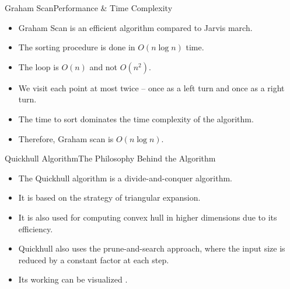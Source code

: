 \documentclass{beamer}
\begin{document}
\begin{frame}{Graham Scan}{Performance \& Time Complexity}
    \begin{itemize}
        \item Graham Scan is an efficient algorithm compared to Jarvis march.
        \vspace{0.25 em}
        \item The sorting procedure is done in $O(n \log n)$ time. 
        \vspace{0.25 em}
        \item The loop is $O(n)$ and not $O(n^2)$.
        \vspace{0.25 em}
        \item We visit each point at most twice -- once as a left turn and once as a right turn. 
        \vspace{0.25 em}
        \item The time to sort dominates the time complexity of the algorithm. 
        \vspace{0.25 em}
        \item Therefore, Graham scan is $O(n \log n)$.
    \end{itemize}
\end{frame}

\begin{frame}{Quickhull Algorithm}{The Philosophy Behind the Algorithm}
    \begin{itemize}
        \item The Quickhull algorithm is a divide-and-conquer algorithm. 
        \vspace{0.5 em}
        \item It is based on the strategy of triangular expansion. 
        \vspace{0.5 em}
        \item It is also used for computing convex hull in higher dimensions due to its efficiency. 
        \vspace{0.5 em}
        \item Quickhull also uses the prune-and-search approach, where the input size 
        is reduced by a constant factor at each step. 
        \vspace{0.5 em}
        \item Its working can be visualized \href{https://upload.wikimedia.org/wikipedia/commons/4/42/Animation_depicting_the_quickhull_algorithm.gif}{\color{magenta}{here}}.
    \end{itemize}
\end{frame} 
\end{document}
